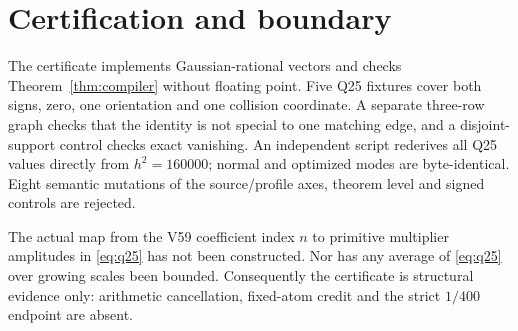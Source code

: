 \section{Certification and boundary}

The certificate implements Gaussian-rational vectors and checks
Theorem~\ref{thm:compiler} without floating point.  Five Q25 fixtures cover both signs,
zero, one orientation and one collision coordinate.  A separate three-row graph checks
that the identity is not special to one matching edge, and a disjoint-support control
checks exact vanishing.  An independent script rederives all Q25 values directly from
$h^2=160000$; normal and optimized modes are byte-identical.  Eight semantic mutations
of the source/profile axes, theorem level and signed controls are rejected.

The actual map from the V59 coefficient index $n$ to primitive multiplier amplitudes
in \eqref{eq:q25} has not been constructed.  Nor has any average of
\eqref{eq:q25} over growing scales been bounded.  Consequently the certificate is
structural evidence only: arithmetic cancellation, fixed-atom credit and the strict
$1/400$ endpoint are absent.
